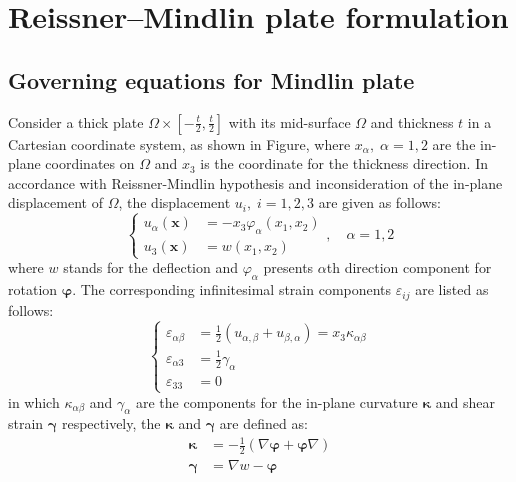 \section{Reissner--Mindlin plate formulation}

\subsection{Governing equations for Mindlin plate}

Consider a thick plate $\Omega\times [-\frac{t}{2},\frac{t}{2}]$ with its mid-surface $\Omega$ and thickness $t$ in a Cartesian coordinate system, as shown in Figure, where $x_\alpha,\; \alpha=1,2$ are the in-plane coordinates on $\Omega$ and $x_3$ is the coordinate for the thickness direction.
In accordance with Reissner-Mindlin hypothesis and inconsideration of the in-plane displacement of $\Omega$, the displacement $u_i,\; i = 1,2,3$ are given as follows:
\begin{equation}
    \left\{
    \begin{aligned}
        u_\alpha(\boldsymbol x) &= - x_3 \varphi_\alpha(x_1, x_2) \\
        u_3(\boldsymbol x) &= w(x_1, x_2)
    \end{aligned}
    \right.
    , \quad \alpha = 1, 2
\end{equation}
where $w$ stands for the deflection and $\varphi_\alpha$ presents $\alpha$th direction component for rotation $\boldsymbol \varphi$.
The corresponding infinitesimal strain components $\varepsilon_{ij}$ are listed as follows:
\begin{equation}
    \left\{
    \begin{aligned}
        \varepsilon_{\alpha\beta} &= \frac{1}{2} (u_{\alpha,\beta} + u_{\beta,\alpha})
        = x_3 \kappa_{\alpha\beta} \\
        \varepsilon_{\alpha 3} &= \frac{1}{2} \gamma_\alpha \\
        \varepsilon_{33} &= 0
    \end{aligned}
    \right.
\end{equation}
in which $\kappa_{\alpha\beta}$ and $\gamma_\alpha$ are the components for the in-plane curvature $\boldsymbol \kappa$ and shear strain $\boldsymbol \gamma$ respectively, the $\boldsymbol \kappa$ and $\boldsymbol \gamma$ are defined as:
\begin{align}
    \boldsymbol \kappa &= - \frac{1}{2} (\nabla \boldsymbol \varphi+\boldsymbol \varphi \nabla )
    \\
    \boldsymbol \gamma &= \nabla w - \boldsymbol \varphi
\end{align}


